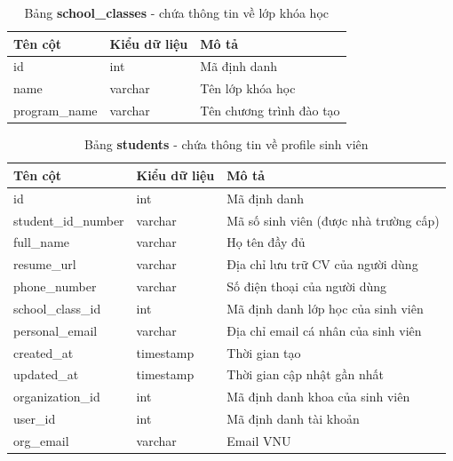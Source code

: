 \documentclass[./../main.tex]{subfiles}
\begin{document}
\begin{table}[H]
	\caption[Bảng school\_classes]{Bảng \textbf{school\_classes} - chứa thông tin về lớp khóa học}
	\label{tab:db_school_classes}
	\begin{tabular}{|l|l|l|}
		\hline
		\textbf{Tên cột} & \textbf{Kiểu dữ liệu} & \textbf{Mô tả}           \\ \hline
		id               & int                   & Mã định danh             \\ \hline
		name             & varchar               & Tên lớp khóa học         \\ \hline
		program\_name    & varchar               & Tên chương trình đào tạo \\ \hline
	\end{tabular}
\end{table}

\begin{table}[H]
	\caption[Bảng students]{Bảng \textbf{students} - chứa thông tin về profile sinh viên}
	\label{tab:db_students}
	\begin{tabularx}{\textwidth}{|l|l|X|}
		\hline
		\textbf{Tên cột}    & \textbf{Kiểu dữ liệu} & \textbf{Mô tả}                        \\ \hline
		id                  & int                   & Mã định danh                          \\ \hline
		student\_id\_number & varchar               & Mã số sinh viên (được nhà trường cấp) \\ \hline
		full\_name          & varchar               & Họ tên đầy đủ                         \\ \hline
		resume\_url         & varchar               & Địa chỉ lưu trữ CV của người dùng     \\ \hline
		phone\_number       & varchar               & Số điện thoại của người dùng          \\ \hline
		school\_class\_id   & int                   & Mã định danh lớp học của sinh viên    \\ \hline
		personal\_email     & varchar               & Địa chỉ email cá nhân của sinh viên   \\ \hline
		created\_at         & timestamp             & Thời gian tạo                         \\ \hline
		updated\_at         & timestamp             & Thời gian cập nhật gần nhất           \\ \hline
		organization\_id    & int                   & Mã định danh khoa của sinh viên       \\ \hline
		user\_id            & int                   & Mã định danh tài khoản                \\ \hline
		org\_email          & varchar               & Email VNU                             \\ \hline
	\end{tabularx}%
\end{table}
\end{document}
